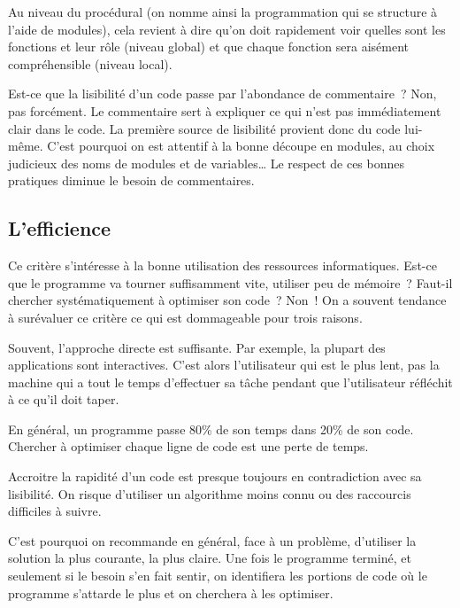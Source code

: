 		Au niveau du procédural (on nomme ainsi la programmation qui se
		structure à l’aide de modules), cela revient à dire
		qu’on doit rapidement voir quelles sont les fonctions et
		leur rôle (niveau global) et que chaque fonction sera aisément
		compréhensible (niveau local).
		
		Est-ce que la lisibilité d’un code passe par
		l’abondance de commentaire~? 
		Non, pas forcément. 
		Le commentaire sert à expliquer 
		ce qui n’est pas immédiatement clair dans le code. 
		La première source de lisibilité provient donc du code lui-même. 
		C’est pourquoi on est attentif à la bonne découpe en modules, 
		au choix judicieux des noms de modules et de variables\dots{}
		Le respect de ces bonnes pratiques 
		diminue le besoin de commentaires.
		
	\subsection{L’efficience}
	
		Ce critère s’intéresse à la bonne utilisation des
		ressources informatiques. Est-ce que le programme va tourner
		suffisamment vite, utiliser peu de mémoire~? Faut-il chercher
		systématiquement à optimiser son code~? Non~! On a souvent tendance à
		surévaluer ce critère ce qui est dommageable pour trois raisons.
	
		\begin{liste}
		\item
			Souvent, l’approche directe est suffisante. 
			Par exemple, la plupart des applications sont interactives.
			C’est alors l’utilisateur qui est le plus lent, 
			pas la machine qui a tout le temps d’effectuer sa tâche
			pendant que l’utilisateur réfléchit à ce qu’il doit taper.
		\item 
			En général, un programme passe 80\% de son temps dans 20\% de son code.
			Chercher à optimiser chaque ligne de code est une perte de temps.
		\item 
			Accroitre la rapidité d’un code est presque toujours 
			en contradiction avec sa lisibilité. 
			On risque d’utiliser un algorithme moins connu 
			ou des raccourcis difficiles à suivre.
		\end{liste}
	
		C’est pourquoi on recommande en général, face à un problème, 
		d’utiliser la solution la plus courante, la plus claire. 
		Une fois le programme terminé, 
		et seulement si le besoin s’en fait sentir, 
		on identifiera les portions de code où le programme s’attarde 
		le plus et on cherchera à les optimiser.
	
